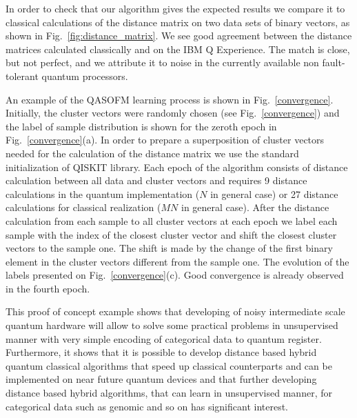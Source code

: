 \documentclass[pra,showkeys,twocolumn,showpacs]{revtex4-1}
\begin{document}
In order to check that our algorithm gives the expected results we compare it to classical calculations of the distance matrix on two data sets of binary vectors, as shown in Fig.~\ref{fig:distance_matrix}.  
We see good agreement between the distance matrices calculated classically and on the IBM Q Experience. 
The match is close, but not perfect, and we attribute it to noise in the currently available non fault-tolerant quantum processors.

An example of the QASOFM learning process is shown in Fig.~\ref{convergence}. 
Initially, the cluster vectors were randomly chosen (see Fig.~\ref{convergence}) 
and the label of sample distribution is shown for the zeroth epoch in Fig.~\ref{convergence}(a). In order to prepare a superposition of cluster vectors needed for the calculation of the distance matrix we use the standard initialization of QISKIT\cite{qiskit} library. 
Each epoch of the algorithm consists of distance calculation between all data and cluster vectors 
and requires 9 distance calculations in the  quantum implementation ($N$ in general case) 
or 27 distance calculations for classical realization 
($MN$ in general case). 
After the distance calculation from each sample to all cluster vectors at each epoch we label each sample with the index of the closest cluster vector 
and shift the closest cluster vectors to the sample one. 
The shift is made by the change of the first binary element in the cluster vectors different from the sample one. 
The evolution of the labels presented on Fig.~\ref{convergence}(c).  
Good convergence is already observed in the fourth epoch.

This proof of concept example shows that developing of noisy intermediate scale quantum hardware will allow to solve some practical problems in unsupervised manner with very simple encoding of categorical data to quantum register. 
Furthermore, it shows that it is possible to develop distance based hybrid quantum classical algorithms 
that speed up classical counterparts and can be implemented on near future quantum devices 
and that further developing distance based hybrid algorithms, 
that can learn in unsupervised manner, for categorical data such as genomic and so on has significant interest.
\end{document}
